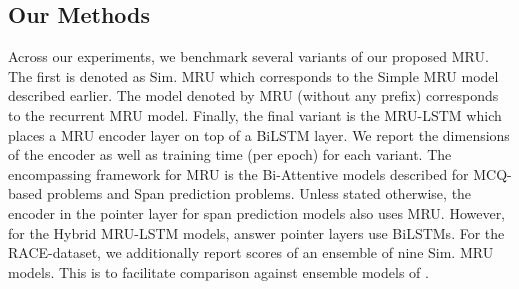 \documentclass{article}
\begin{document}
\subsection{Our Methods}
Across our experiments, we benchmark several variants of our proposed MRU. The first is denoted as Sim. MRU which corresponds to the Simple MRU model described earlier. The model denoted by MRU (without any prefix) corresponds to the recurrent MRU model. Finally, the final variant is the MRU-LSTM which places a MRU encoder layer on top of a BiLSTM layer. We report the dimensions of the encoder as well as training time (per epoch) for each variant. The encompassing framework for MRU is the Bi-Attentive models described for MCQ-based problems and Span prediction problems. Unless stated otherwise, the encoder in the pointer layer for span prediction models also uses MRU. However, for the Hybrid MRU-LSTM models, answer pointer layers use BiLSTMs. For the RACE-dataset, we additionally report scores of an ensemble of nine Sim. MRU models. This is to facilitate comparison against ensemble models of \cite{xu2017towards}. 
\end{document}
